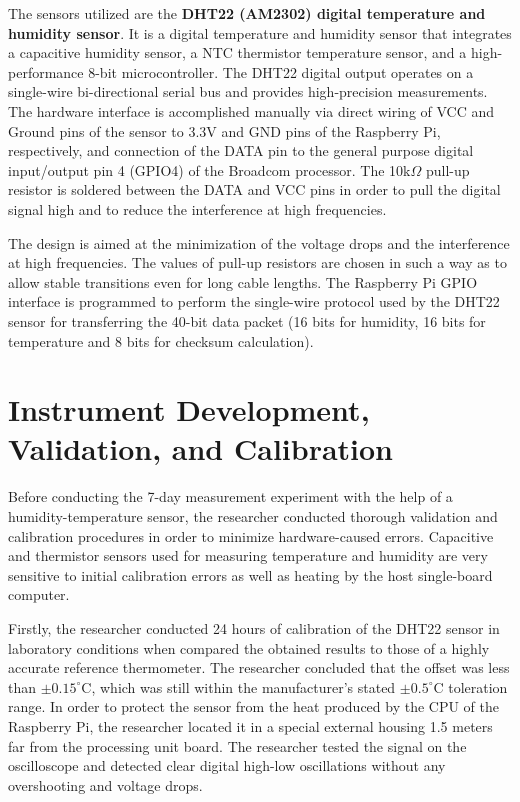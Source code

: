 The sensors utilized are the \textbf{DHT22 (AM2302) digital temperature and humidity sensor}. It is a digital temperature and humidity sensor that integrates a capacitive humidity sensor, a NTC thermistor temperature sensor, and a high-performance 8-bit microcontroller. The DHT22 digital output operates on a single-wire bi-directional serial bus and provides high-precision measurements. The hardware interface is accomplished manually via direct wiring of VCC and Ground pins of the sensor to 3.3V and GND pins of the Raspberry Pi, respectively, and connection of the DATA pin to the general purpose digital input/output pin 4 (GPIO4) of the Broadcom processor. The 10k$\Omega$ pull-up resistor is soldered between the DATA and VCC pins in order to pull the digital signal high and to reduce the interference at high frequencies.

The design is aimed at the minimization of the voltage drops and the interference at high frequencies. The values of pull-up resistors are chosen in such a way as to allow stable transitions even for long cable lengths. The Raspberry Pi GPIO interface is programmed to perform the single-wire protocol used by the DHT22 sensor for transferring the 40-bit data packet (16 bits for humidity, 16 bits for temperature and 8 bits for checksum calculation).

\section{Instrument Development, Validation, and Calibration}
\label{sec:calibration}
Before conducting the 7-day measurement experiment with the help of a humidity-temperature sensor, the researcher conducted thorough validation and calibration procedures in order to minimize hardware-caused errors. Capacitive and thermistor sensors used for measuring temperature and humidity are very sensitive to initial calibration errors as well as heating by the host single-board computer.

Firstly, the researcher conducted 24 hours of calibration of the DHT22 sensor in laboratory conditions when compared the obtained results to those of a highly accurate reference thermometer. The researcher concluded that the offset was less than $\pm0.15^\circ$C, which was still within the manufacturer's stated $\pm0.5^\circ$C toleration range. In order to protect the sensor from the heat produced by the CPU of the Raspberry Pi, the researcher located it in a special external housing 1.5 meters far from the processing unit board. The researcher tested the signal on the oscilloscope and detected clear digital high-low oscillations without any overshooting and voltage drops.

